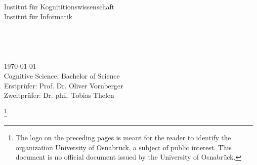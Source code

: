 \begin{titlepage}
\begin{addmargin}[-1cm]{-3cm}
\begin{center}
      Institut für Kognititionswissenschaft \\ \medskip
      Institut für Informatik

      \vfill

      \Large
       \\
      \bigskip

      \begingroup
        \LARGE
        \color{uos_red}\spacedallcaps{\Title} \\
        \bigskip
      \endgroup

      \Large
      \spacedallcaps{\Author}

      \vfill
      \vfill
    \end{center}

    \today \\
    Cognitive Science, Bachelor of Science \\
    Erstprüfer: Prof. Dr. Oliver Vornberger \\
    Zweitprüfer: Dr. phil. Tobias Thelen \\
  \end{addmargin}
  \clearpage

  \thispagestyle{empty}
  \newcommand\blfootnote[1]{
    \begingroup
    \renewcommand\thefootnote{}\footnote{#1}
    \addtocounter{footnote}{-1}
    \endgroup
  }
  \blfootnote{The logo on the preceding pages is meant for the reader to identify the organization University of Osnabrück, a subject of public interest. This document is no official document issued by the University of Osnabrück.}
  \cleardoublepage
\end{titlepage}
